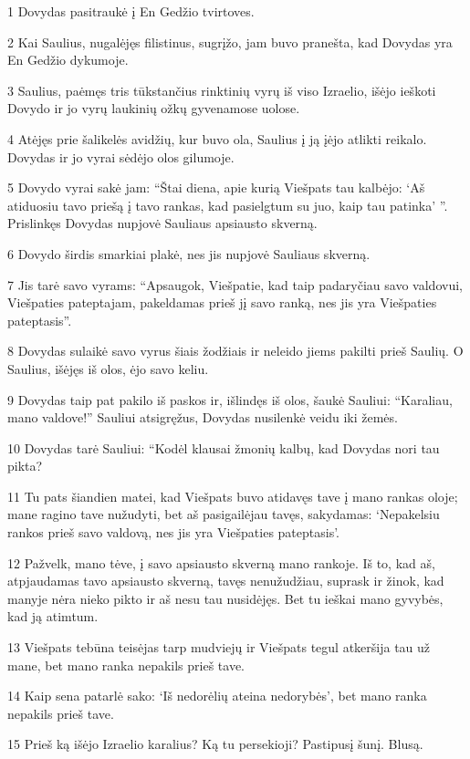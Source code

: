 \par 1 Dovydas pasitraukė į En Gedžio tvirtoves. 
\par 2 Kai Saulius, nugalėjęs filistinus, sugrįžo, jam buvo pranešta, kad Dovydas yra En Gedžio dykumoje. 
\par 3 Saulius, paėmęs tris tūkstančius rinktinių vyrų iš viso Izraelio, išėjo ieškoti Dovydo ir jo vyrų laukinių ožkų gyvenamose uolose. 
\par 4 Atėjęs prie šalikelės avidžių, kur buvo ola, Saulius į ją įėjo atlikti reikalo. Dovydas ir jo vyrai sėdėjo olos gilumoje. 
\par 5 Dovydo vyrai sakė jam: “Štai diena, apie kurią Viešpats tau kalbėjo: ‘Aš atiduosiu tavo priešą į tavo rankas, kad pasielgtum su juo, kaip tau patinka’ ”. Prislinkęs Dovydas nupjovė Sauliaus apsiausto skverną. 
\par 6 Dovydo širdis smarkiai plakė, nes jis nupjovė Sauliaus skverną. 
\par 7 Jis tarė savo vyrams: “Apsaugok, Viešpatie, kad taip padaryčiau savo valdovui, Viešpaties pateptajam, pakeldamas prieš jį savo ranką, nes jis yra Viešpaties pateptasis”. 
\par 8 Dovydas sulaikė savo vyrus šiais žodžiais ir neleido jiems pakilti prieš Saulių. O Saulius, išėjęs iš olos, ėjo savo keliu. 
\par 9 Dovydas taip pat pakilo iš paskos ir, išlindęs iš olos, šaukė Sauliui: “Karaliau, mano valdove!” Sauliui atsigręžus, Dovydas nusilenkė veidu iki žemės. 
\par 10 Dovydas tarė Sauliui: “Kodėl klausai žmonių kalbų, kad Dovydas nori tau pikta? 
\par 11 Tu pats šiandien matei, kad Viešpats buvo atidavęs tave į mano rankas oloje; mane ragino tave nužudyti, bet aš pasigailėjau tavęs, sakydamas: ‘Nepakelsiu rankos prieš savo valdovą, nes jis yra Viešpaties pateptasis’. 
\par 12 Pažvelk, mano tėve, į savo apsiausto skverną mano rankoje. Iš to, kad aš, atpjaudamas tavo apsiausto skverną, tavęs nenužudžiau, suprask ir žinok, kad manyje nėra nieko pikto ir aš nesu tau nusidėjęs. Bet tu ieškai mano gyvybės, kad ją atimtum. 
\par 13 Viešpats tebūna teisėjas tarp mudviejų ir Viešpats tegul atkeršija tau už mane, bet mano ranka nepakils prieš tave. 
\par 14 Kaip sena patarlė sako: ‘Iš nedorėlių ateina nedorybės’, bet mano ranka nepakils prieš tave. 
\par 15 Prieš ką išėjo Izraelio karalius? Ką tu persekioji? Pastipusį šunį. Blusą. 
